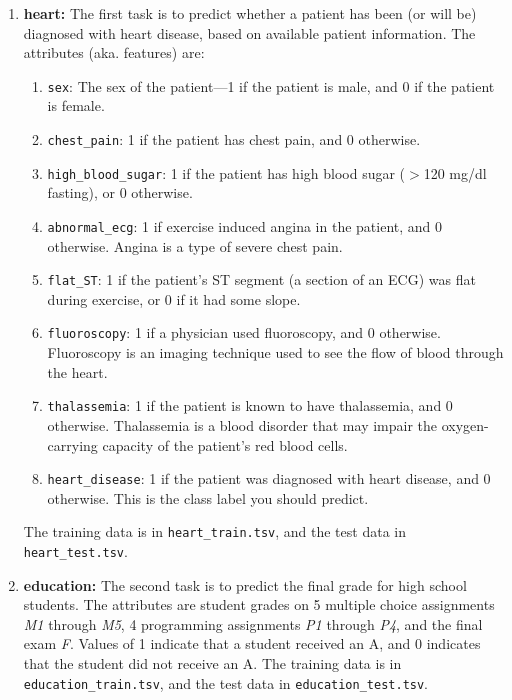 \documentclass[11pt,addpoints,answers]{exam}
\begin{document}
\begin{enumerate}
\item \textbf{heart:}
    The first task is to predict whether a patient has been (or will be) diagnosed with heart disease, based on available patient information. The attributes (aka. features) are: 
    \begin{enumerate}
        \item \lstinline{sex}: The sex of the patient---1 if the patient is male, and 0 if the patient is female.
        \item \lstinline{chest_pain}: 1 if the patient has chest pain, and 0 otherwise.
        \item \lstinline{high_blood_sugar}: 1 if the patient has high blood sugar ($>$120 mg/dl fasting), or 0 otherwise.
        \item \lstinline{abnormal_ecg}: 1 if exercise induced angina in the patient, and 0 otherwise. Angina is a type of severe chest pain.
        \item \lstinline{flat_ST}: 1 if the patient's ST segment (a section of an ECG) was flat during exercise, or 0 if it had some slope.
        \item \lstinline{fluoroscopy}: 1 if a physician used fluoroscopy, and 0 otherwise. Fluoroscopy is an imaging technique used to see the flow of blood through the heart.
        \item \lstinline{thalassemia}: 1 if the patient is known to have thalassemia, and 0 otherwise. Thalassemia is a blood disorder that may impair the oxygen-carrying capacity of the patient's red blood cells.
        \item \lstinline{heart_disease}: 1 if the patient was diagnosed with heart disease, and 0 otherwise. This is the class label you should predict.
    \end{enumerate}
    The training data is in \lstinline{heart_train.tsv}, and the test data in \lstinline{heart_test.tsv}.
\item \textbf{education:}
    The second task is to predict the final grade for high school students. The attributes are student grades on 5 multiple choice assignments \emph{M1} through \emph{M5}, 4 programming assignments \emph{P1} through \emph{P4}, and the final exam \emph{F}. Values of 1 indicate that a student received an A, and 0 indicates that the student did not receive an A. The training data is in \newline \lstinline{education_train.tsv}, and the test data in \lstinline{education_test.tsv}.

\end{enumerate}
\end{document}

